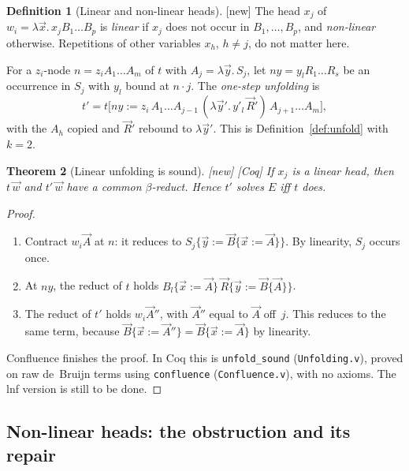 \documentclass[11pt]{article}
\newcommand{\suc}[2]{#1{\cdot}#2}
\newcommand{\New}{\textsf{[new]}}
\newcommand{\Coq}{\textsf{[Coq]}}
\theoremstyle{plain}
\newtheorem{theorem}{Theorem}[section]
\theoremstyle{definition}
\newtheorem{definition}[theorem]{Definition}
\theoremstyle{remark}
\begin{document}
\begin{definition}[Linear and non-linear heads]\label{def:linear}
\New{} The head $x_j$ of $w_i=\lambda\vec x.\,x_j B_1\dots B_p$ is
\emph{linear} if $x_j$ does not occur in $B_1,\dots,B_p$, and
\emph{non-linear} otherwise.  Repetitions of other variables $x_h$,
$h\ne j$, do not matter here.
\end{definition}

For a $z_i$-node $n=z_i A_1\dots A_m$ of $t$ with $A_j=\lambda\vec y.\,S_j$,
let $ny=y_l R_1\dots R_s$ be an occurrence in $S_j$ with $y_l$ bound at
$\suc nj$.  The \emph{one-step unfolding} is
\[
t'=t\bigl[ny:=z_i\,A_1\dots A_{j-1}\,(\lambda\vec y'.\,y'_l\,\vec R')\,
A_{j+1}\dots A_m\bigr],
\]
with the $A_h$ copied and $\vec R'$ rebound to $\lambda\vec y'$.  This is
Definition~\ref{def:unfold} with $k=2$.

\begin{theorem}[Linear unfolding is sound]\label{thm:linunfold}
\New{} \Coq{} If $x_j$ is a linear head, then $t\,\vec w$ and
$t'\,\vec w$ have a common $\beta$-reduct.  Hence $t'$ solves $E$ iff
$t$ does.
\end{theorem}
\begin{proof}
\begin{enumerate}
\item Contract $w_i\vec A$ at $n$: it reduces to
  $S_j\{\vec y:=\vec B\{\vec x:=\vec A\}\}$.  By linearity, $S_j$
  occurs once.
\item At $ny$, the reduct of $t$ holds
  $B_l\{\vec x:=\vec A\}\,\vec R\{\vec y:=\vec B\{\vec A\}\}$.
\item The reduct of $t'$ holds $w_i\vec A''$, with $\vec A''$ equal to
  $\vec A$ off~$j$.  This reduces to the same term, because
  $\vec B\{\vec x:=\vec A''\}=\vec B\{\vec x:=\vec A\}$ by linearity.
\end{enumerate}
Confluence finishes the proof.  In Coq this is \texttt{unfold\_sound}
(\texttt{Unfolding.v}), proved on raw de~Bruijn terms using
\texttt{confluence} (\texttt{Confluence.v}), with no axioms.  The lnf
version is still to be done.
\end{proof}

\subsection{Non-linear heads: the obstruction and its repair}\label{sec:nonlinear}
\end{document}
